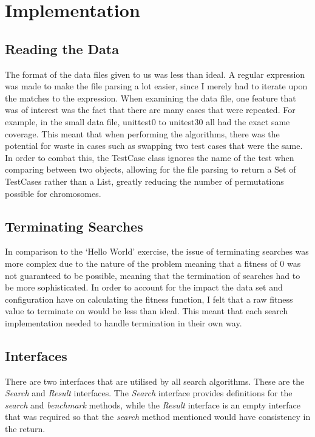\documentclass[11pt, a4paper]{article}
\begin{document}
\section{Implementation}
\subsection{Reading the Data}
The format of the data files given to us was less than ideal. A regular
expression was made to make the file parsing a lot easier, since I merely had to
iterate upon the matches to the expression. When examining the data file, one
feature that was of interest was the fact that there are many cases that were
repeated. For example, in the small data file, unittest0 to unitest30 all had
the exact same coverage. This meant that when performing the algorithms, there
was the potential for waste in cases such as swapping two test cases that were
the same. In order to combat this, the TestCase class ignores the name of the
test when comparing between two objects, allowing for the file parsing to return
a Set of TestCases rather than a List, greatly reducing the number of
permutations possible for chromosomes.

\subsection{Terminating Searches}
In comparison to the `Hello World' exercise, the issue of terminating searches
was more complex due to the nature of the problem meaning that a fitness of 0
was not guaranteed to be possible, meaning that the termination of searches had
to be more sophisticated. In order to account for the impact the data set and
configuration have on calculating the fitness function, I felt that a raw
fitness value to terminate on would be less than ideal. This meant that each
search implementation needed to handle termination in their own way.

\subsection{Interfaces}
There are two interfaces that are utilised by all search algorithms. These are
the \emph{Search} and \emph{Result} interfaces. The \emph{Search} interface
provides definitions for the \emph{search} and \emph{benchmark} methods, while
the \emph{Result} interface is an empty interface that was required so that the
\emph{search} method mentioned would have consistency in the return.
\end{document}
